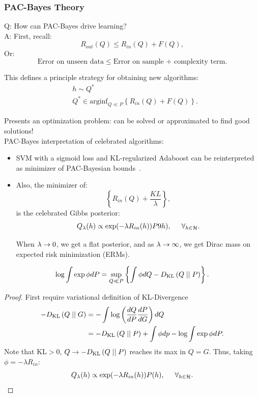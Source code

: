 \subsubsection{PAC-Bayes Theory}

Q: How can PAC-Bayes drive learning? \\

A: First, recall:
\begin{equation}
    R_{out}(Q) \leq R_{in}(Q) + F(Q),
\end{equation}
Or:
\begin{equation}
    \text{Error on unseen data} \leq \text{Error on sample + complexity term}.
\end{equation}

This defines a principle strategy for obtaining new algorithms:
\begin{align}
    &h \sim Q^* \\
    &Q^* \in \text{arginf}_{Q \ll P} \left\{R_{in}(Q) + F(Q)\right\}.
\end{align}

Presents an optimization problem: can be solved or approximated to find good solutions! \\

PAC-Bayes interpretation of celebrated algorithms: 
\begin{itemize}
    \item SVM with a sigmoid loss and KL-regularized Adaboost can be reinterpreted as minimizer of PAC-Bayesian bounds~\cite{ambroladze2007tighter}.
    \item Also, the minimizer of:
    \[
    \left\{R_{in}(Q) + \frac{KL}{\lambda}\right\},
    \]
    is the celebrated Gibbs posterior:
    \[
    Q_\lambda(h) \propto \exp(-\lambda R_{in}(h)) P9h), \hspace{5mm} \forall_{h \in \mathcal{H}}.
    \]
    
    When $\lambda \rightarrow 0$, we get a flat posterior, and as $\lambda \rightarrow \infty$, we get Dirac mass on expected risk minimization (ERMs).
\end{itemize}



\begin{theorem}
\[
\log \int \exp \phi dP = \sup_{Q \ll P} \left\{ \int \phi dQ - D_{\text{KL}}\left(Q \mid \mid P\right)\right\}.
\]
\end{theorem}
\begin{proof}
First require variational definition of KL-Divergence~\cite{csiszar1975divergence}
\begin{align}
    -D_{\text{KL}}\left(Q \mid \mid G\right) &= - \int \log\left(\frac{dQ}{dP} \frac{dP}{dG}\right) dQ \\
    &= -D_{\text{KL}}\left(Q \mid \mid P\right) + \int \phi dp - \log \int \exp \phi dP.
\end{align}
Note that KL$>0$, $Q \rightarrow -D_{\text{KL}}\left(Q \mid \mid P\right)$ reaches its max in $Q=G$. Thus, taking $\phi = -\lambda R_{in}$:
\[
Q_\lambda(h) \propto \exp(-\lambda R_{in}(h)) P(h), \hspace{5mm} \forall_{h \in \mathcal{H}}. \qedhere
\]
\end{proof}

